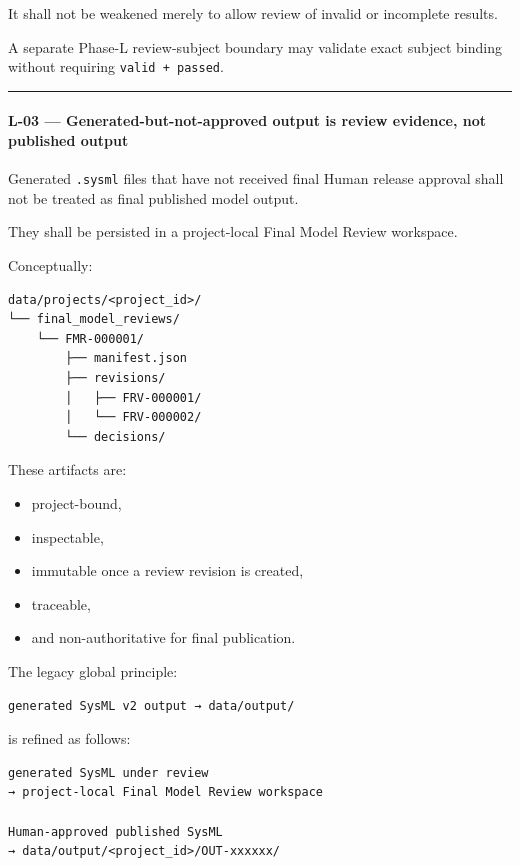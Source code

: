 It shall not be weakened merely to allow review of invalid or incomplete results.

A separate Phase-L review-subject boundary may validate exact subject binding without requiring \texttt{valid\ +\ passed}.

\begin{center}\rule{0.5\linewidth}{0.5pt}\end{center}

\hypertarget{l-03--generated-but-not-approved-output-is-review-evidence-not-published-output}{%
\paragraph{L-03 --- Generated-but-not-approved output is review evidence, not published output}\label{l-03--generated-but-not-approved-output-is-review-evidence-not-published-output}}

Generated \texttt{.sysml} files that have not received final Human release approval shall not be treated as final published model output.

They shall be persisted in a project-local Final Model Review workspace.

Conceptually:

\begin{verbatim}
data/projects/<project_id>/
└── final_model_reviews/
    └── FMR-000001/
        ├── manifest.json
        ├── revisions/
        │   ├── FRV-000001/
        │   └── FRV-000002/
        └── decisions/
\end{verbatim}

These artifacts are:

\begin{itemize}
\tightlist
\item
  project-bound,
\item
  inspectable,
\item
  immutable once a review revision is created,
\item
  traceable,
\item
  and non-authoritative for final publication.
\end{itemize}

The legacy global principle:

\begin{verbatim}
generated SysML v2 output → data/output/
\end{verbatim}

is refined as follows:

\begin{verbatim}
generated SysML under review
→ project-local Final Model Review workspace

Human-approved published SysML
→ data/output/<project_id>/OUT-xxxxxx/
\end{verbatim}

